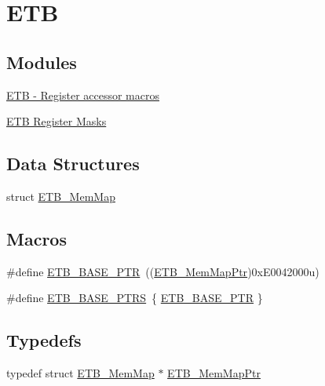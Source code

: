 \hypertarget{group___e_t_b___peripheral}{}\section{E\+T\+B}
\label{group___e_t_b___peripheral}
\subsection*{Modules}
\begin{DoxyCompactItemize}
\item 
\hyperlink{group___e_t_b___register___accessor___macros}{E\+T\+B -\/ Register accessor macros}
\item 
\hyperlink{group___e_t_b___register___masks}{E\+T\+B Register Masks}
\end{DoxyCompactItemize}
\subsection*{Data Structures}
\begin{DoxyCompactItemize}
\item 
struct \hyperlink{struct_e_t_b___mem_map}{E\+T\+B\+\_\+\+Mem\+Map}
\end{DoxyCompactItemize}
\subsection*{Macros}
\begin{DoxyCompactItemize}
\item 
\#define \hyperlink{group___e_t_b___peripheral_gaaefe9b614cb5542a69cb7461307f1267}{E\+T\+B\+\_\+\+B\+A\+S\+E\+\_\+\+P\+T\+R}~((\hyperlink{group___e_t_b___peripheral_ga8b44c770780865d622e8799d88981d9e}{E\+T\+B\+\_\+\+Mem\+Map\+Ptr})0x\+E0042000u)
\item 
\#define \hyperlink{group___e_t_b___peripheral_gac711afdddacdf91115488b20e07ded2f}{E\+T\+B\+\_\+\+B\+A\+S\+E\+\_\+\+P\+T\+R\+S}~\{ \hyperlink{group___e_t_b___peripheral_gaaefe9b614cb5542a69cb7461307f1267}{E\+T\+B\+\_\+\+B\+A\+S\+E\+\_\+\+P\+T\+R} \}
\end{DoxyCompactItemize}
\subsection*{Typedefs}
\begin{DoxyCompactItemize}
\item 
typedef struct \hyperlink{struct_e_t_b___mem_map}{E\+T\+B\+\_\+\+Mem\+Map} $\ast$ \hyperlink{group___e_t_b___peripheral_ga8b44c770780865d622e8799d88981d9e}{E\+T\+B\+\_\+\+Mem\+Map\+Ptr}
\end{DoxyCompactItemize}


